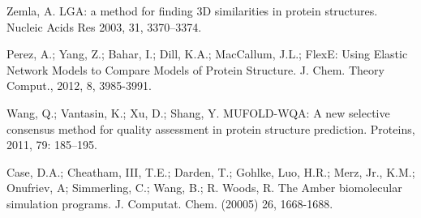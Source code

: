 \documentclass[12pt]{article}
\begin{document}
\begin{thebibliography}{99}
Zemla, A. LGA: a method for finding 3D similarities in protein structures. Nucleic Acids Res 2003, 31, 3370–3374.


Perez, A.; Yang, Z.; Bahar, I.; Dill, K.A.; MacCallum, J.L.; FlexE: Using Elastic Network Models to Compare Models of Protein Structure. J. Chem. Theory Comput., 2012, 8, 3985-3991. 

Wang, Q.; Vantasin, K.; Xu, D.; Shang, Y. MUFOLD-WQA: A new selective consensus method for quality assessment in protein structure prediction. 
Proteins, 2011, 79: 185–195. 

Case, D.A.; Cheatham, III, T.E.; Darden, T.; Gohlke, Luo, H.R.; Merz, Jr., K.M.;  Onufriev, A; Simmerling, C.; 
Wang, B.; R. Woods, R. The Amber biomolecular simulation programs. J. Computat. Chem. (20005) 26, 1668-1688.



\end{thebibliography}
\end{document}
